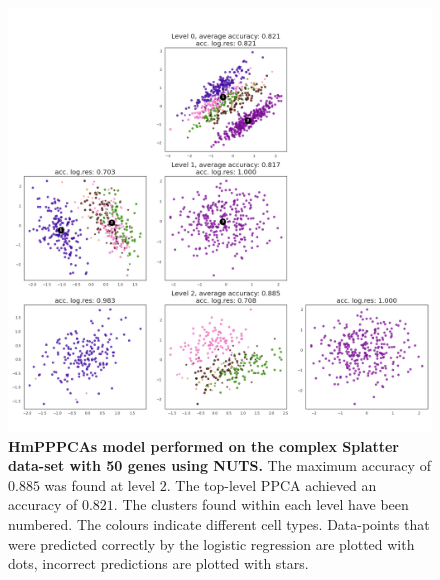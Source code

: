 \begin{figure}
    \centering
    \includegraphics[width=\linewidth]{figs/complex_50_nuts.png}
    \caption[HmPPPCAs model performed on the complex Splatter data-set with 50 genes using NUTS]{\small \textbf{HmPPPCAs model performed on the complex Splatter data-set with 50 genes using NUTS.} \small The maximum accuracy of $0.885$ was found at level $2$. The top-level PPCA achieved an accuracy of $0.821$. The clusters found within each level have been numbered. The colours indicate different cell types. Data-points that were predicted correctly by the logistic regression are plotted with dots, incorrect predictions are plotted with stars.}
    \label{fig:complex_50_nuts}
\end{figure}

